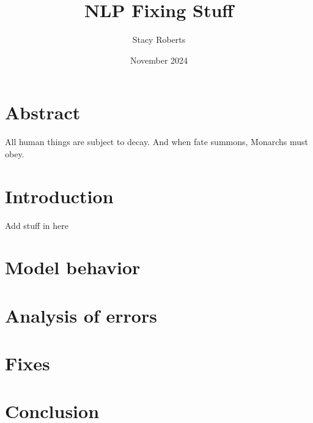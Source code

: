 \documentclass{article}
\title{NLP Fixing Stuff}
\author{Stacy Roberts}
\date{November 2024}
\begin{document}
\maketitle

\begin{multicols*}{2}

\section{Abstract}
All human things are subject to decay. And when fate summons, Monarchs must obey.

\section{Introduction}

Add stuff in here

\section{Model behavior}

\section{Analysis of errors}

\section{Fixes}

\section{Conclusion}

\end{multicols*}
\end{document}
